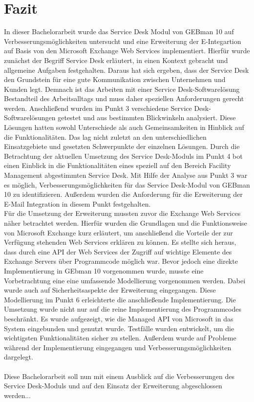 \section{Fazit}

\noindent
In dieser Bachelorarbeit wurde das Service Desk Modul von GEBman 10 auf Verbesserungsmöglichkeiten untersucht und eine Erweiterung der E-Integartion auf Basis von den Microsoft Exchange Web Services implementiert. Hierfür wurde zunächst der Begriff Service Desk erläutert, in einen Kontext gebracht und allgemeine Aufgaben festgehalten. Daraus hat sich ergeben, dass der Service Desk den Grundstein für eine gute Kommunikation zwischen Unternehmen und Kunden legt. Demnach ist das Arbeiten mit einer Service Desk-Softwarelösung Bestandteil des Arbeitsalltags und muss daher speziellen Anforderungen gerecht werden.\newline
Anschließend wurden im Punkt 3 verschiedene Service Desk-Softwarelösungen getestet und aus bestimmten Blickwinkeln analysiert. Diese Lösungen hatten sowohl Unterschiede als auch Gemeinsamkeiten in Hinblick auf die Funktionalitäten. Das lag nicht zuletzt an den unterschiedlichen Einsatzgebiete und gesetzten Schwerpunkte der einzelnen Lösungen.\newline
Durch die Betrachtung der aktuellen Umsetzung des Service Desk-Moduls im Punkt 4 bot einen Einblick in die Funktionalitäten eines speziell auf den Bereich Facility Management abgestimmten Service Desk. Mit Hilfe der Analyse aus Punkt 3 war es möglich, Verbesserungsmöglichkeiten für das Service Desk-Modul von GEBman 10 zu identifizieren. Außerdem wurden die Anforderung für die Erweiterung der E-Mail Integration in diesem Punkt festgehalten. \\

\noindent
Für die Umsetzung der Erweiterung mussten zuvor die Exchange Web Services näher betrachtet werden. Hierfür wurden die Grundlagen und die Funktionsweise von Microsoft Exchange kurz erläutert, um anschließend die Vorteile der zur Verfügung stehenden Web Services erklären zu können. Es stellte sich heraus, dass durch eine API der Web Services der Zugriff auf wichtige Elemente des Exchange Servers über Programmcode möglich war. Bevor jedoch eine direkte Implementierung in GEbman 10 vorgenommen wurde, musste eine Vorbetrachtung eine eine umfassende Modellierung vorgenommen werden. Dabei wurde auch auf Sicherheitsaspekte der Erweiterung eingegangen. Diese Modellierung im Punkt 6 erleichterte die anschließende Implementierung.\newline
Die Umsetzung wurde nicht nur auf die reine Implementierung des Programmcodes beschränkt. Es wurde aufgezeigt, wie die Managed API von Microsoft in das System eingebunden und genutzt wurde. Testfälle wurden entwickelt, um die wichtigsten Funktionalitäten sicher zu stellen.  Außerdem wurde auf Probleme während der Implementierung eingegangen und Verbesserungsmöglichkeiten dargelegt.\\\\

\noindent
Diese Bachelorarbeit soll nun mit einem Ausblick auf die Verbesserungen des Service Desk-Moduls und auf den Einsatz der Erweiterung abgeschlossen werden...


